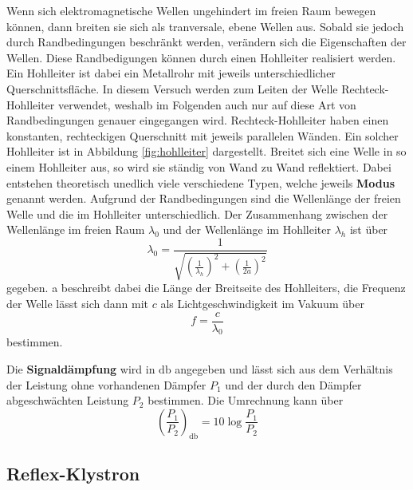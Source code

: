 Wenn sich elektromagnetische Wellen ungehindert im freien Raum bewegen können, dann breiten sie sich als tranversale, ebene Wellen aus. 
Sobald sie jedoch durch Randbedingungen beschränkt werden, verändern sich die Eigenschaften der Wellen. Diese Randbedigungen können durch einen Hohlleiter realisiert werden. Ein Hohlleiter ist dabei ein Metallrohr mit jeweils unterschiedlicher Querschnittsfläche. In diesem Versuch werden zum Leiten der Welle Rechteck-Hohlleiter verwendet, weshalb im Folgenden auch nur auf diese Art von Randbedingungen genauer eingegangen wird. Rechteck-Hohlleiter haben einen konstanten, rechteckigen Querschnitt mit jeweils parallelen Wänden. Ein solcher Hohlleiter ist in Abbildung \ref{fig:hohlleiter} dargestellt.
Breitet sich eine Welle in so einem Hohlleiter aus, so wird sie ständig von Wand zu Wand reflektiert. Dabei entstehen theoretisch unedlich viele verschiedene Typen, welche jeweils \textbf{Modus} genannt werden. Aufgrund der Randbedingungen sind die Wellenlänge der freien Welle und die im Hohlleiter unterschiedlich. Der Zusammenhang zwischen der Wellenlänge im freien Raum $\lambda_0$ und der Wellenlänge im Hohlleiter $\lambda_h$ ist über 
\begin{equation}
    \lambda_0 = \frac{1}{\sqrt{\left(\frac{1}{\lambda_h}\right)^2+\left(\frac{1}{2a}\right)^2}}
\end{equation}
gegeben. a beschreibt dabei die Länge der Breitseite des Hohlleiters,
die Frequenz der Welle lässt sich dann mit $c$ als Lichtgeschwindigkeit im Vakuum über
\begin{equation}
    \label{eqn:f}
    f = \frac{c}{\lambda_0}
\end{equation}
bestimmen.

Die \textbf{Signaldämpfung} wird in $\si{\decibel}$ angegeben und lässt sich aus dem Verhältnis der Leistung ohne vorhandenen Dämpfer $P_1$ und der durch den Dämpfer abgeschwächten Leistung $P_2$ bestimmen.
Die Umrechnung kann über
\begin{equation}
    \left(\frac{P_1}{P_2}\right)_{\si{\decibel}} = 10 \log\frac{P_1}{P_2}
\end{equation}

\subsection{Reflex-Klystron}


